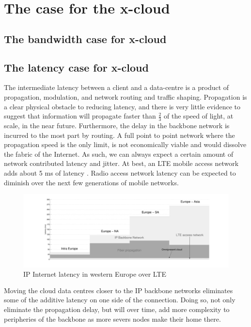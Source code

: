 \documentclass[conference]{IEEEtran}
\newcommand{\xcloud}{x-cloud }
\begin{document}
\section{The case for the \xcloud}

\subsection{The bandwidth case for \xcloud}

\subsection{The latency case for \xcloud}
The intermediate latency between a client and a data-centre is a product of propagation, modulation, and network routing and traffic shaping. Propagation is a clear physical obstacle to reducing latency, and there is very little evidence to suggest that information will propagate faster than $\frac{2}{3}$ of the speed of light, at scale, in the near future. Furthermore, the delay in the backbone network is incurred to the most part by routing. A full point to point network where the propagation speed is the only limit, is not economically viable and would dissolve the fabric of the Internet. As such, we can always expect a certain amount of network contributed latency and jitter. At best, an LTE mobile access network adds about 5 ms of latency \cite{blajic2006latency}. Radio access network latency can be expected to diminish over the next few generations of mobile networks. 

\begin{figure}[tb]
	\centering
	\includegraphics[height=0.12\paperheight]{omni_motivation.pdf} 
	\caption{IP Internet latency in western Europe \cite{BT_IP} over LTE \cite{blajic2006latency}}
	\label{fig:omni_motivation}
\end{figure}

Moving the cloud data centres closer to the IP backbone networks eliminates some of the additive latency on one side of the connection. Doing so, not only eliminate the propagation delay, but will over time, add more complexity to peripheries of the backbone as more severs nodes make their home there. 
\end{document}
